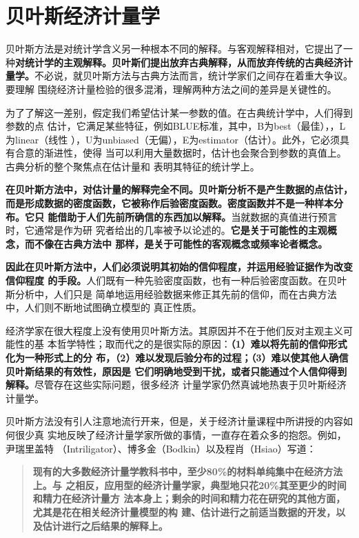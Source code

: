 \section{贝叶斯经济计量学}

贝叶斯方法是对统计学含义另一种根本不同的解释。与客观解释相对，它提出了一
种\textbf{对统计学的主观解释。贝叶斯们提出放弃古典解释，从而放弃传统的古典经济计
  量学。}不必说，就贝叶斯方法与古典方法而言，统计学家们之间存在着重大争议。要理解
围绕经济计量检验的很多混淆，理解两种方法之间的差异是关键性的。

为了了解这一差别，假定我们希望估计某一参数的值。在古典统计学中，人们得到参数的点
估计，它满足某些特征，例如BLUE标准，其中，B为best（最佳），，L为linear（线性
），U为unbiased（无偏），E为estimator（估计）。此外，它必须具有合意的渐进性，使得
当可以利用大量数据时，估计也会聚合到参数的真值上。古典分析的整个聚焦点在估计量和
表明其特征的统计学上。

\textbf{在贝叶斯方法中，对估计量的解释完全不同。贝叶斯分析不是产生数据的点估计，
  而是形成数据的密度函数，它被称作后验密度函数。密度函数并不是一种样本分布。它只
  能借助于人们先前所确信的东西加以解释。}当就数据的真值进行预言时，它通常是作为研
究者给出的几率被予以论述的。\textbf{它是关于可能性的主观概念，而不像在古典方法中
  那样，是关于可能性的客观概念或频率论者概念。}

\textbf{因此在贝叶斯方法中，人们必须说明其初始的信仰程度，并运用经验证据作为改变信仰程度
的手段。}人们既有一种先验密度函数，也有一种后验密度函数。在贝叶斯分析中，人们只是
简单地运用经验数据来修正其先前的信仰，而在古典方法中，人们则不断地试图确立模型的
真正性质。

经济学家在很大程度上没有使用贝叶斯方法。其原因并不在于他们反对主观主义可能性的基
本哲学特性；取而代之的是很实际的原因：\textbf{（1）难以将先前的信仰形式化为一种形式上的分
布，（2）难以发现后验分布的过程；（3）难以使其他人确信贝叶斯结果的有效性，原因是
它们明确地受到干扰，或者只能通过个人信仰得到解释。}尽管存在这些实际问题，很多经济
计量学家仍然真诚地热衷于贝叶斯经济计量学。

贝叶斯方法没有引人注意地流行开来，但是，关于经济计量课程中所讲授的内容如何很少真
实地反映了经济计量学家所做的事情，一直存在着众多的抱怨。例如，尹瑞里盖特
（Intriligator）、博多金（Bodkin）以及程肖（Hsiao）写道：

\begin{quotation}
  \textbf{现有的大多数经济计量学教科书中，至少80\%的材料单纯集中在经济方法上。与
    之相反，应用型的经济计量学家，典型地只花20\%其至更少的时间和精力在经济计量方
    法本身上；剩余的时间和精力花在研究的其他方面，尤其是花在相关经济计量模型的构
    建、估计进行之前适当数据的开发，以及估计进行之后结果的解释上。}
\end{quotation}

